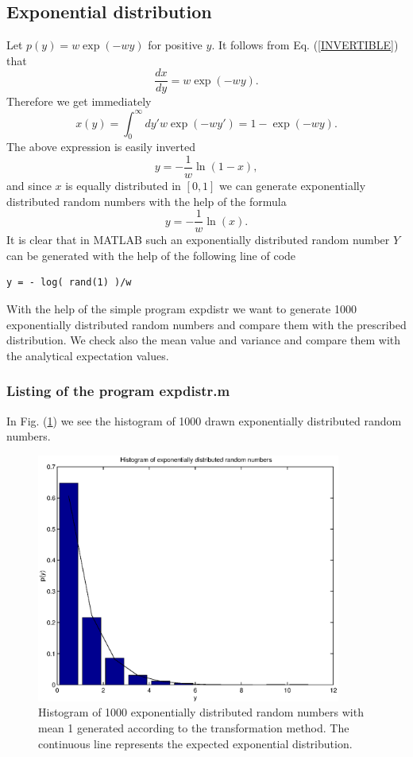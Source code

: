 \subsection{Exponential distribution}
Let $p(y)= w\exp(-wy)$ for positive $y$. It follows from Eq. (\ref{INVERTIBLE})
that
\begin{equation*}
\frac{dx}{dy} = w \exp(-wy).
\end{equation*}
Therefore we get immediately
\begin{equation*}
x(y) = \int_0^{\infty} dy'w\exp(-wy') = 1-\exp(-wy).
\end{equation*}
The above expression is easily inverted
\begin{equation*}
y=-\frac{1}{w}\ln(1-x),
\end{equation*}
and since $x$ is equally distributed in $[0,1]$ we can generate 
exponentially distributed random numbers with the help of the 
formula
\begin{equation}
y = - \frac{1}{w} \ln(x).
\end{equation}
It is clear that in MATLAB such an exponentially distributed 
random number $Y$ can be generated with the help of the following 
line of code
\begin{verbatim}
y = - log( rand(1) )/w
\end{verbatim}
With the help of the simple program {\sf expdistr} we want to 
generate 1000 exponentially distributed random numbers and compare
them with the prescribed distribution. We check also the mean 
value and variance and compare them with the analytical expectation 
values.

\subsubsection{Listing of the program expdistr.m}

In Fig. (\ref{F_EXPDISTR}) we see the histogram of 1000 drawn exponentially 
distributed random numbers.
\begin{figure}
\label{F_EXPDISTR}
\includegraphics[width=10cm]{./Figures/f_expdistr.eps}
\caption{Histogram of 1000 exponentially distributed random numbers with
mean 1 generated according to the transformation method. The continuous
line represents the expected exponential distribution.}
\end{figure}

